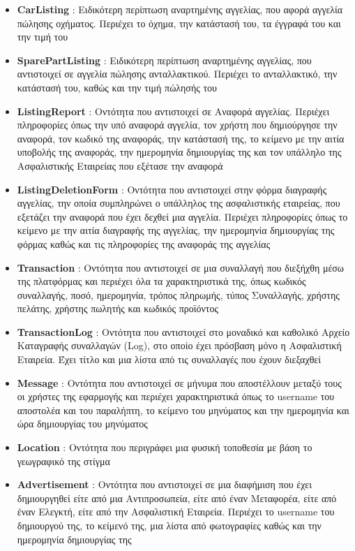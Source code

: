 \documentclass{../ol-softwaremanual}
\begin{document}
\begin{itemize}
		\item \en \textbf{CarListing} \gr : Ειδικότερη περίπτωση αναρτημένης αγγελίας, που αφορά αγγελία πώλησης οχήματος. Περιέχει το όχημα, την κατάστασή του, τα έγγραφά του και την τιμή του
		\item \en \textbf{SparePartListing} \gr : Ειδικότερη περίπτωση αναρτημένης αγγελίας, που αντιστοιχεί σε αγγελία πώλησης ανταλλακτικού. Περιέχει το ανταλλακτικό, την κατάστασή του, καθώς και την τιμή πώλησής του
		\item \en \textbf{ListingReport} \gr : Οντότητα που αντιστοιχεί σε Αναφορά αγγελίας. Περιέχει πληροφορίες όπως την υπό αναφορά αγγελία, τον χρήστη που δημιούργησε την αναφορά, τον κωδικό της αναφοράς, την κατάστασή της, το κείμενο με την αιτία υποβολής της αναφοράς, την ημερομηνία δημιουργίας της και τον υπάλληλο της Ασφαλιστικής Εταιρείας που εξέτασε την αναφορά
		\item \en \textbf{ListingDeletionForm} \gr : Οντότητα που αντιστοιχεί στην φόρμα διαγραφής αγγελίας, την οποία συμπληρώνει ο υπάλληλος της ασφαλιστικής εταιρείας, που εξετάζει την αναφορά που έχει δεχθεί μια αγγελία. Περιέχει πληροφορίες όπως το κείμενο με την αιτία διαγραφής της αγγελίας, την ημερομηνία δημιουργίας της φόρμας καθώς και τις πληροφορίες της αναφοράς της αγγελίας			
		\item \en \textbf{Transaction} \gr : Οντότητα που αντιστοιχεί σε μια συναλλαγή που διεξήχθη μέσω της πλατφόρμας και περιέχει όλα τα χαρακτηριστικά της, όπως κωδικός συναλλαγής, ποσό, ημερομηνία, τρόπος πληρωμής, τύπος Συναλλαγής, χρήστης πελάτης, χρήστης πωλητής και κωδικός προϊόντος
		\item \en \textbf{TransactionLog} \gr : Οντότητα που αντιστοιχεί στο μοναδικό και καθολικό Αρχείο Καταγραφής συναλλαγών (\en Log\gr), στο οποίο έχει πρόσβαση μόνο η Ασφαλιστική Εταιρεία. Έχει τίτλο και μια λίστα από τις συναλλαγές που έχουν διεξαχθεί
		\item \en \textbf{Message} \gr : Οντότητα που αντιστοιχεί σε μήνυμα που αποστέλλουν μεταξύ τους οι χρήστες της εφαρμογής και περιέχει χαρακτηριστικά όπως το \en username \gr του αποστολέα και του παραλήπτη, το κείμενο του μηνύματος και την ημερομηνία και ώρα δημιουργίας του μηνύματος
		\item \en \textbf{Location} \gr : Οντότητα που περιγράφει μια φυσική τοποθεσία με βάση το γεωγραφικό της στίγμα
		\item \en \textbf{Advertisement} \gr : Οντότητα που αντιστοιχεί σε μια διαφήμιση που έχει δημιουργηθεί είτε από μια Αντιπροσωπεία, είτε από έναν Μεταφορέα, είτε από έναν Ελεγκτή, είτε από την Ασφαλιστική Εταιρεία. Περιέχει το \en username \gr του δημιουργού της, το κείμενό της, μια λίστα από φωτογραφίες καθώς και την ημερομηνία δημιουργίας της

\end{itemize}
\end{document}
